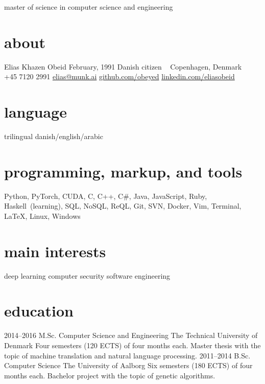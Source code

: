 \documentclass[]{friggeri-cv}
\begin{document}
    {master of science in computer science and engineering}

\begin{aside}
  \section{about}
    Elias Khazen Obeid
    February, 1991
    Danish citizen
    ~
    Copenhagen, Denmark
    ~
    +45 7120 2991
    \href{mailto:elias@munk.ai}{elias@munk.ai}
    \href{https://github.com/obeyed}{github.com/obeyed}
    \href{https://www.linkedin.com/in/eliasobeid}{linkedin.com/eliasobeid}
  \section{language}
    trilingual danish/english/arabic
  \section{programming, markup, and tools}
  	Python, PyTorch, CUDA, C, C++, C\#,
    Java, JavaScript, Ruby, Haskell~(learning),
    SQL, NoSQL, ReQL,
    Git, SVN, Docker, Vim, Terminal, \LaTeX{}, Linux, Windows
  \section{main interests}
    deep learning
    computer security
    software engineering
\end{aside}

\section{education}

\begin{entrylist}
  \entry
    {2014--2016}
    {M.Sc. {\normalfont Computer Science and Engineering}}
    {The Technical University of Denmark}
    {Four semesters (120 ECTS) of four months each.
	Master thesis with the topic of machine translation and natural language processing.}
  \entry
    {2011--2014}
    {B.Sc. {\normalfont Computer Science}}
    {The University of Aalborg}
    {Six semesters (180 ECTS) of four months each.
	Bachelor project with the topic of genetic algorithms.}
\end{entrylist}
\end{document}
